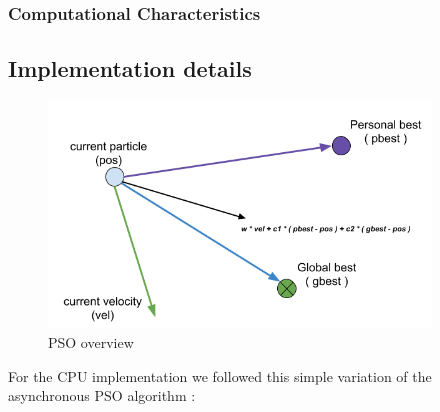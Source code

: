 \documentclass[journal]{IEEEtran}
\begin{document}
\subsubsection{ Computational Characteristics }

\subsection{Implementation details}

\begin{figure}
\centering
\includegraphics[width=4.0in]{_img/img_PSO_overview.png}
\caption{PSO overview}
\end{figure}

For the CPU implementation we followed this simple variation of the asynchronous PSO algorithm :
\end{document}
